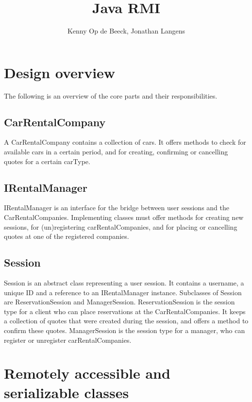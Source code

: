 \documentclass[10pt]{article}
\author{Kenny Op de Beeck, Jonathan Langens}
\title{Java RMI}
\begin{document}
\maketitle

\section{Design overview}

The following is an overview of the core parts and their responsibilities.

\subsection{CarRentalCompany}

A CarRentalCompany contains a collection of cars. It offers methods to check for available cars in a certain period, and for creating, confirming or cancelling quotes for a certain carType.

\subsection{IRentalManager}

IRentalManager is an interface for the bridge between user sessions and the CarRentalCompanies. Implementing classes must offer methods for creating new sessions, for (un)registering carRentalCompanies, and for placing or cancelling quotes at one of the registered companies.

\subsection{Session}

Session is an abstract class representing a user session. It contains a username, a unique ID and a reference to an IRentalManager instance. Subclasses of Session are ReservationSession and ManagerSession. ReservationSession is the session type for a client who can place reservations at the CarRentalCompanies. It keeps a collection of quotes that were created during the session, and offers a method to confirm these quotes. ManagerSession is the session type for a manager, who can register or unregister carRentalCompanies.

\section{Remotely accessible and serializable classes}
\end{document}
